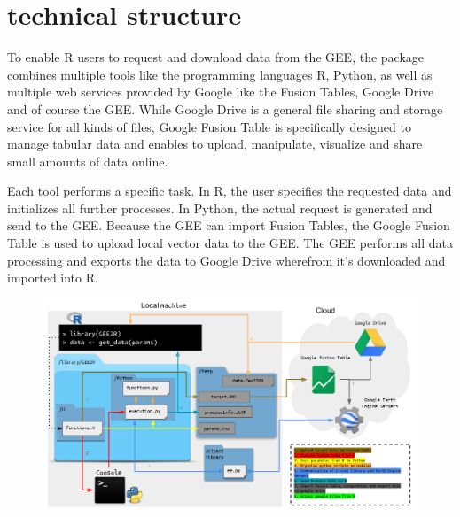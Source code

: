 \documentclass[12pt,twoside,a4paper,final]{report}
\begin{document}
\section{technical structure}

To enable R users to request and download data from the GEE, the package combines multiple tools like the programming languages R, Python, as well as multiple web services provided by Google like the Fusion Tables, Google Drive and of course the GEE. While Google Drive is a general file sharing and storage service for all kinds of files, Google Fusion Table is specifically designed to manage tabular data and enables to upload, manipulate, visualize and share small amounts of data online.
 
Each tool performs a specific task. In R, the user specifies the requested data and initializes all further processes. In Python, the actual request is generated and send to the GEE. Because the GEE can import Fusion Tables, the Google Fusion Table is used to upload local vector data to the GEE. The GEE performs all data processing and exports the data to Google Drive wherefrom it's downloaded and imported into R. 


\begin{center}

   \begin{figure}[h]
     \begin{center}
       \includegraphics[width=15cm]{images/processin_folw.pdf}
    \end{center}
  \end{figure}
\end{center}
\end{document}
